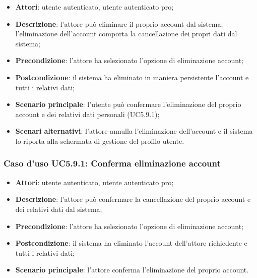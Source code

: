\begin{itemize}
	\item \textbf{Attori}: utente autenticato, utente autenticato pro;
	\item \textbf{Descrizione}: l'attore può eliminare il proprio account dal sistema; l'eliminazione dell'account comporta la cancellazione dei propri dati dal sistema; 
	\item \textbf{Precondizione}: l'attore ha selezionato l'opzione di eliminazione account;
	\item \textbf{Postcondizione}: il sistema ha eliminato in maniera persistente l'account e tutti i relativi dati;
	\item \textbf{Scenario principale}: l'utente può confermare l'eliminazione del proprio account e dei relativi dati personali (UC5.9.1);
	\item \textbf{Scenari alternativi}: l'attore annulla l'eliminazione dell'account e il sistema lo riporta alla schermata di gestione del profilo utente.
\end{itemize}

\subsubsection{Caso d'uso UC5.9.1: Conferma eliminazione account}

\begin{itemize}
	\item \textbf{Attori}: utente autenticato, utente autenticato pro;
	\item \textbf{Descrizione}: l'attore può confermare la cancellazione del proprio account e dei relativi dati dal sistema;
	\item \textbf{Precondizione}: l'attore ha selezionato l'opzione di eliminazione account;
	\item \textbf{Postcondizione}: il sistema ha eliminato l'account dell'attore richiedente e tutti i relativi dati;
	\item \textbf{Scenario principale}: l'attore conferma l'eliminazione del proprio account.
\end{itemize}